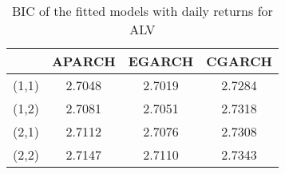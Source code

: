 
\begin{table}[!h]
 \small
  \centering
  \vspace{2ex} 
\begin{tabular}{c|c|c|c}
\toprule
	         &	APARCH	& EGARCH	& CGARCH	\\
\midrule
\hline		 

(1,1)&	2.7048	& 2.7019	&2.7284	 \\
(1,2)&	2.7081	& 2.7051	&2.7318	 \\
(2,1)&	2.7112	& 2.7076	&2.7308	 \\
(2,2)&	2.7147	& 2.7110	&2.7343	 \\
\bottomrule

\end{tabular}
  \caption{BIC of the fitted models with daily returns for ALV}
  \label{tab:dailyBICforALV}
\end{table}





